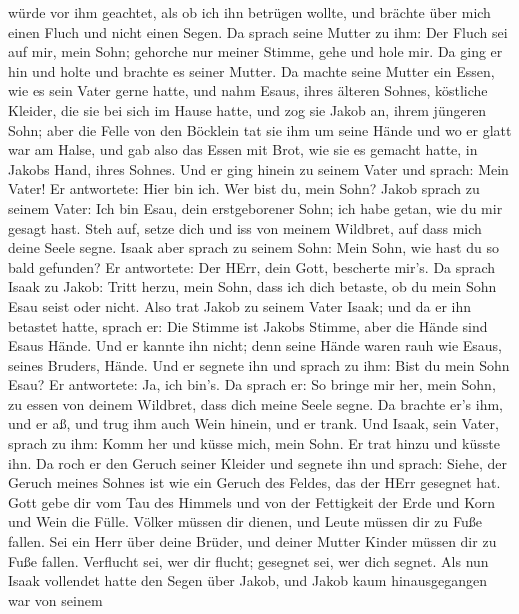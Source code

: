 würde vor ihm geachtet, als ob ich ihn betrügen wollte, und brächte über
mich einen Fluch und nicht einen Segen.  Da sprach seine
Mutter zu ihm: Der Fluch sei auf mir, mein Sohn; gehorche nur meiner
Stimme, gehe und hole mir.  Da ging er hin und holte und
brachte es seiner Mutter. Da machte seine Mutter ein Essen, wie es sein
Vater gerne hatte,  und nahm Esaus, ihres älteren Sohnes,
köstliche Kleider, die sie bei sich im Hause hatte, und zog sie Jakob
an, ihrem jüngeren Sohn;  aber die Felle von den Böcklein
tat sie ihm um seine Hände und wo er glatt war am Halse, 
und gab also das Essen mit Brot, wie sie es gemacht hatte, in Jakobs
Hand, ihres Sohnes.  Und er ging hinein zu seinem Vater und
sprach: Mein Vater! Er antwortete: Hier bin ich. Wer bist du, mein Sohn?
 Jakob sprach zu seinem Vater: Ich bin Esau, dein
erstgeborener Sohn; ich habe getan, wie du mir gesagt hast. Steh auf,
setze dich und iss von meinem Wildbret, auf dass mich deine Seele segne.
 Isaak aber sprach zu seinem Sohn: Mein Sohn, wie hast du
so bald gefunden? Er antwortete: Der HErr, dein Gott, bescherte mir's.
 Da sprach Isaak zu Jakob: Tritt herzu, mein Sohn, dass ich
dich betaste, ob du mein Sohn Esau seist oder nicht.  Also
trat Jakob zu seinem Vater Isaak; und da er ihn betastet hatte, sprach
er: Die Stimme ist Jakobs Stimme, aber die Hände sind Esaus Hände.
 Und er kannte ihn nicht; denn seine Hände waren rauh wie
Esaus, seines Bruders, Hände. Und er segnete ihn  und
sprach zu ihm: Bist du mein Sohn Esau? Er antwortete: Ja, ich bin's.
 Da sprach er: So bringe mir her, mein Sohn, zu essen von
deinem Wildbret, dass dich meine Seele segne. Da brachte er's ihm, und
er aß, und trug ihm auch Wein hinein, und er trank.  Und
Isaak, sein Vater, sprach zu ihm: Komm her und küsse mich, mein Sohn.
 Er trat hinzu und küsste ihn. Da roch er den Geruch seiner
Kleider und segnete ihn und sprach: Siehe, der Geruch meines Sohnes ist
wie ein Geruch des Feldes, das der HErr gesegnet hat.  Gott
gebe dir vom Tau des Himmels und von der Fettigkeit der Erde und Korn
und Wein die Fülle.  Völker müssen dir dienen, und Leute
müssen dir zu Fuße fallen. Sei ein Herr über deine Brüder, und deiner
Mutter Kinder müssen dir zu Fuße fallen. Verflucht sei, wer dir flucht;
gesegnet sei, wer dich segnet.  Als nun Isaak vollendet
hatte den Segen über Jakob, und Jakob kaum hinausgegangen war von seinem
